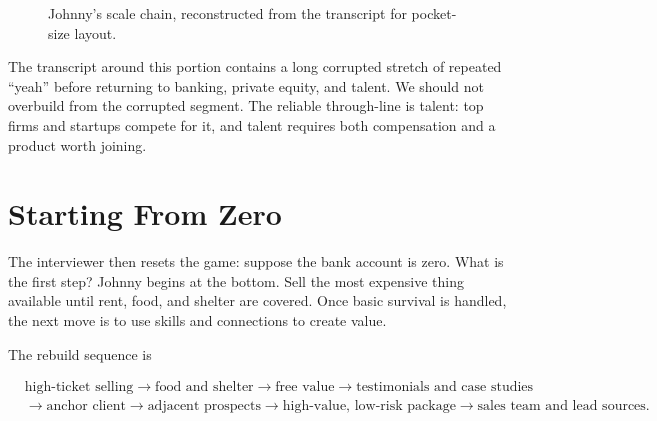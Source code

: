 \begin{figure}
\centering
{}
\caption{Johnny's scale chain, reconstructed from the transcript for pocket-size layout.}
\end{figure}

The transcript around this portion contains a long corrupted stretch of repeated ``yeah'' before returning to banking, private equity, and talent. We should not overbuild from the corrupted segment. The reliable through-line is talent: top firms and startups compete for it, and talent requires both compensation and a product worth joining.

\section{Starting From Zero}

The interviewer then resets the game: suppose the bank account is zero. What is the first step? Johnny begins at the bottom. Sell the most expensive thing available until rent, food, and shelter are covered. Once basic survival is handled, the next move is to use skills and connections to create value.

The rebuild sequence is

\begin{equation}
\begin{aligned}
&\text{high-ticket selling}
\rightarrow
\text{food and shelter}
\rightarrow
\text{free value}
\rightarrow
\text{testimonials and case studies}\\
&\rightarrow
\text{anchor client}
\rightarrow
\text{adjacent prospects}
\rightarrow
\text{high-value, low-risk package}
\rightarrow
\text{sales team and lead sources}.
\end{aligned}
\end{equation}

